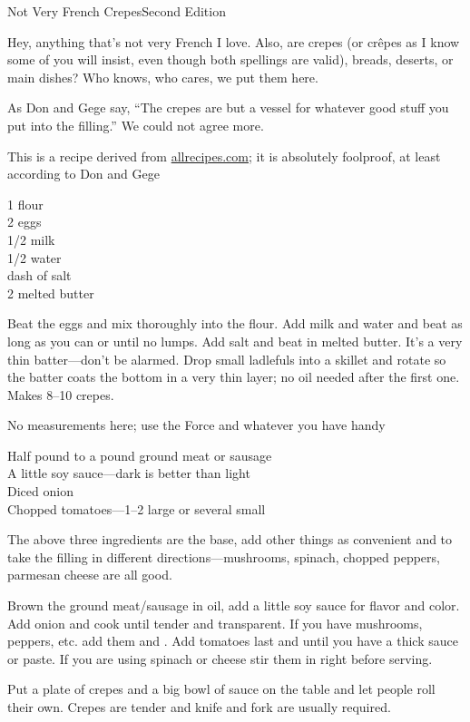 
\begin{entry}{Not Very French Crepes}{Second Edition}

\begin{open}
    Hey, anything that's not very French I love.  Also, are crepes (or
    cr\^{e}pes as I know some of you will insist, even though both spellings are
    valid), breads, deserts, or main dishes?  Who knows, who cares, we put them
    here.

    As Don and Gege say, ``The crepes are but a vessel for whatever good stuff
    you put into the filling.''  We could not agree more.

    This is a recipe derived from \url{allrecipes.com}; it is absolutely
    foolproof, at least according to Don and Gege
\end{open}
\begin{ingredients}
    \SI{1}{\cup} flour\\
    2 eggs\\
    \SI{1/2}{\cup} milk\\
    \SI{1/2}{\cup} water\\
    dash of salt\\
    \SI{2}{\tblspoon} melted butter
\end{ingredients}
Beat the eggs and mix thoroughly into the flour. Add milk and water and beat as
long as you can or until no lumps. Add salt and beat in melted butter. It's a
very thin batter---don't be alarmed. Drop small ladlefuls into a skillet and
rotate so the batter coats the bottom in a very thin layer; no oil needed after
the first one. Makes \numrange{8}{10} crepes.


\noindent No measurements here; use the Force and whatever you have handy
\begin{ingredients}
    Half pound to a pound ground meat or sausage\\
    A little soy sauce---dark is better than light\\
    Diced onion\\
    Chopped tomatoes---\numrange{1}{2} large or several small
\end{ingredients}
The above three ingredients are the base, add other things as convenient and
to take the filling in different directions---mushrooms, spinach, chopped
peppers, parmesan cheese are all good.

Brown the ground meat/sausage in oil, add a little soy sauce for flavor and
color. Add onion and cook until tender and transparent. If you have mushrooms,
peppers, etc. add them and \saute. Add tomatoes last and \saute until you
have a thick sauce or paste. If you are using spinach or cheese stir them in
right before serving.

Put a plate of crepes and a big bowl of sauce on the table and let people roll
their own. Crepes are tender and knife and fork are usually required.
\end{entry}

